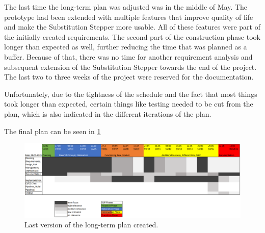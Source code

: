 The last time the long-term plan was adjusted was in the middle of May.
The prototype had been extended with multiple features that improve quality of life and make the Substitution Stepper more usable.
All of these features were part of the initially created requirements.
The second part of the construction phase took longer than expected as well,
further reducing the time that was planned as a buffer.
Because of that, there was no time for another requirement analysis and subsequent extension of the Substitution Stepper towards the end of the project.
The last two to three weeks of the project were reserved for the documentation.

Unfortunately,
due to the tightness of the schedule and the fact that most things took longer than expected,
certain things like testing needed to be cut from the plan, which is also indicated in the different iterations of the plan.

The final plan can be seen in \ref*{fig:longTermPlanMay}

\begin{figure}[!ht]
    \centering
    \includegraphics[width=0.96\textheight,angle=270]{resources/LongTermPlanMay.PNG}
    \caption{Last version of the long-term plan created.}
    \label{fig:longTermPlanMay}
\end{figure}

